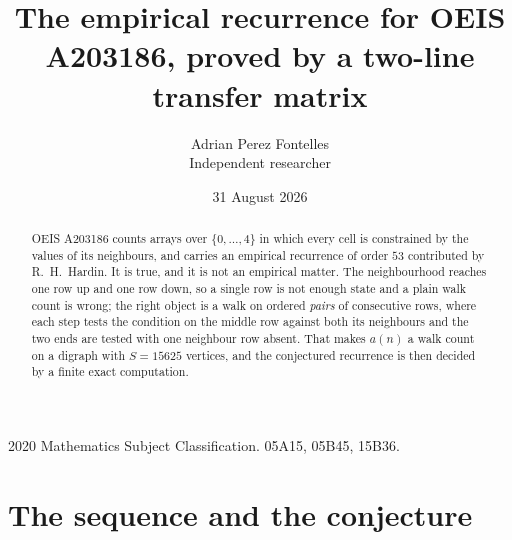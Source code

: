 \documentclass[11pt,a4paper]{article}
\title{The empirical recurrence for OEIS A203186, proved by a two-line transfer matrix}
\author{Adrian Perez Fontelles\\ \small Independent researcher}
\date{31 August 2026}
\theoremstyle{plain}
\theoremstyle{definition}
\begin{document}
\maketitle

\begin{abstract}
OEIS A203186 counts arrays over $\{0,\dots,4\}$ in which every cell is constrained by the
values of its neighbours, and carries an empirical recurrence of order $53$ contributed
by R.~H.~Hardin. It is true, and it is not an empirical matter. The neighbourhood reaches one
row up and one row down, so a single row is not enough state and a plain walk count
is wrong; the right object is a walk on ordered \emph{pairs} of consecutive rows, where
each step tests the condition on the middle row against both its neighbours and the two
ends are tested with one neighbour row absent. That makes $a(n)$ a walk count on a digraph
with $S=15625$ vertices, and the conjectured recurrence is then decided by a finite exact
computation.
\end{abstract}

\noindent\small 2020 Mathematics Subject Classification. 05A15, 05B45, 15B36.\normalsize

\section{The sequence and the conjecture}
\end{document}
